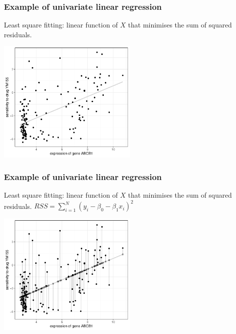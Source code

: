 \documentclass[notes]{beamer}          %
\begin{document}
\begin{frame}
\frametitle{Example of univariate linear regression}
Least square fitting: linear function of $X$ that minimises the sum of squared residuals.

\begin{center}
\includegraphics[height=6cm]{../figures/week_2_linear_models/Univariate_linear_regression_1.pdf}
\end{center}

\end{frame}

\begin{frame}
\frametitle{Example of univariate linear regression}
Least square fitting: linear function of $X$ that minimises the sum of squared residuals. $RSS = \sum_{i=1}^N (y_i - \beta_0 - \beta_1 x_i)^2$

\begin{center}
\includegraphics[height=6cm]{../figures/week_2_linear_models/Univariate_linear_regression_2.pdf}
\end{center}

\end{frame}
\end{document}
